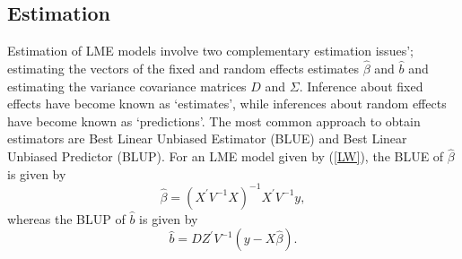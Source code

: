 \documentclass[12pt, a4paper]{report}
\theoremstyle{plain}
\theoremstyle{definition}
\theoremstyle{remark}
\begin{document}


\subsection{Estimation}
Estimation of LME models involve two complementary estimation issues'; estimating the vectors of the fixed and random effects estimates $\hat{\beta}$ and $\hat{b}$ and estimating the variance covariance matrices $D$ and $\Sigma$.
Inference about fixed effects have become known as `estimates', while inferences about random effects have become known as `predictions'. The most common approach to obtain estimators are Best Linear Unbiased Estimator (BLUE) and Best Linear Unbiased Predictor (BLUP). For an LME model given by (\ref{LW}), the BLUE of $\hat{\beta}$ is given by
\[\hat{\beta} = (X^\prime V^{-1}X)^{-1}X^\prime V^{-1}y,\]whereas the BLUP of $\hat{b}$ is given by
\[\hat{b} = DZ^{\prime} V^{-1} (y-X\hat{\beta}).\]
\end{document}
